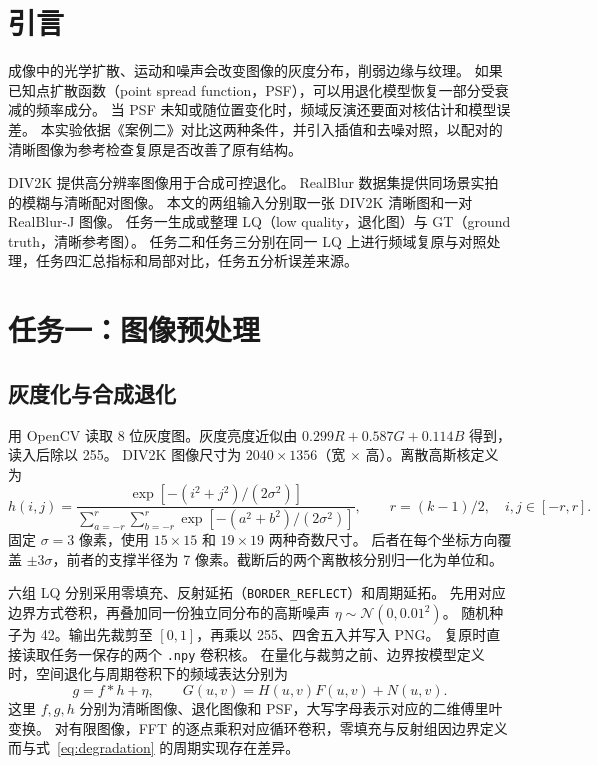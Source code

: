 \documentclass[UTF8,a4paper,zihao=5,fontset=fandol,twoside]{ctexart}
\begin{document}
\clearpage
\section{引言}
成像中的光学扩散、运动和噪声会改变图像的灰度分布，削弱边缘与纹理。
如果已知点扩散函数（point spread function，PSF），可以用退化模型恢复一部分受衰减的频率成分。
当 PSF 未知或随位置变化时，频域反演还要面对核估计和模型误差。
本实验依据《案例二》对比这两种条件，并引入插值和去噪对照，以配对的清晰图像为参考检查复原是否改善了原有结构。

DIV2K 提供高分辨率图像用于合成可控退化\cite{agustsson2017div2k}。
RealBlur 数据集提供同场景实拍的模糊与清晰配对图像\cite{rim2020realblur}。
本文的两组输入分别取一张 DIV2K 清晰图和一对 RealBlur-J 图像。
任务一生成或整理 LQ（low quality，退化图）与 GT（ground truth，清晰参考图）。
任务二和任务三分别在同一 LQ 上进行频域复原与对照处理，任务四汇总指标和局部对比，任务五分析误差来源。

\section{任务一：图像预处理}
\subsection{灰度化与合成退化}
用 OpenCV 读取 8 位灰度图。灰度亮度近似由 \(0.299R+0.587G+0.114B\) 得到，读入后除以 255。
DIV2K 图像尺寸为 \(2040\times1356\)（宽 \(\times\) 高）。离散高斯核定义为
\begin{equation}
h(i,j)=
\frac{\exp[-(i^2+j^2)/(2\sigma^2)]}
     {\sum_{a=-r}^{r}\sum_{b=-r}^{r}\exp[-(a^2+b^2)/(2\sigma^2)]},
\qquad r=(k-1)/2,\quad i,j\in[-r,r].
\end{equation}
固定 \(\sigma=3\) 像素，使用 \(15\times15\) 和 \(19\times19\) 两种奇数尺寸。
后者在每个坐标方向覆盖 \(\pm3\sigma\)，前者的支撑半径为 7 像素。截断后的两个离散核分别归一化为单位和。

六组 LQ 分别采用零填充、反射延拓（\texttt{BORDER\_REFLECT}）和周期延拓。
先用对应边界方式卷积，再叠加同一份独立同分布的高斯噪声 \(\eta\sim\mathcal N(0,0.01^2)\)。
随机种子为 42。输出先裁剪至 \([0,1]\)，再乘以 255、四舍五入并写入 PNG。
复原时直接读取任务一保存的两个 \texttt{.npy} 卷积核。
在量化与裁剪之前、边界按模型定义时，空间退化与周期卷积下的频域表达分别为\cite{gonzalez2018dip}
\begin{equation}
g=f*h+\eta,\qquad G(u,v)=H(u,v)F(u,v)+N(u,v).
\label{eq:degradation}
\end{equation}
这里 \(f,g,h\) 分别为清晰图像、退化图像和 PSF，大写字母表示对应的二维傅里叶变换。
对有限图像，FFT 的逐点乘积对应循环卷积，零填充与反射组因边界定义而与式~\eqref{eq:degradation} 的周期实现存在差异。
\end{document}
